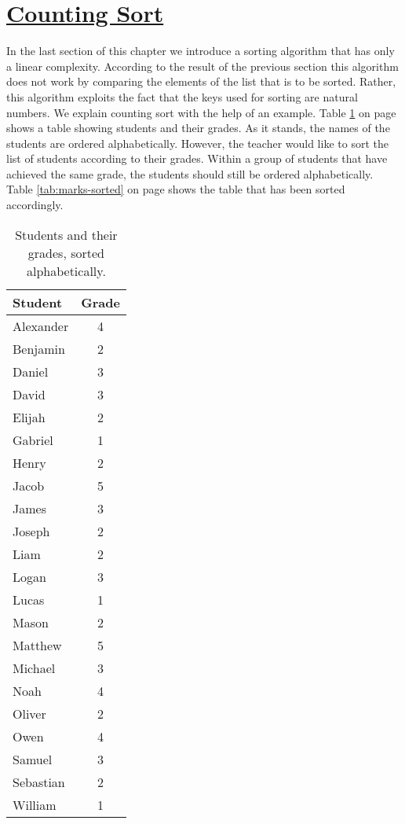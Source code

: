 \section{\href{https://en.wikipedia.org/wiki/Counting_sort}{Counting Sort}}
In the last section of this chapter we introduce a sorting algorithm that has only a linear complexity.  According
to the result of the previous section this algorithm does not work by comparing the elements of the list that
is to be sorted.  Rather, this algorithm exploits the fact that the keys used for sorting are natural
numbers.  We explain counting sort with the help of an example.  Table \ref{tab:marks} on page
\pageref{tab:marks} shows a table showing students and their grades. 
As it stands, the names of the students are ordered alphabetically.  However, the teacher would like to sort
the list of students according to their grades.  Within a group of students that have achieved the same grade,
the students should still be ordered alphabetically.  Table \ref{tab:marks-sorted} on page \pageref{tab:marks-sorted}
shows the table that has been sorted accordingly.

\begin{table}[!ht]
  \centering
  \begin{tabular}{|l|c|}
    \hline
    Student   & Grade \\
    \hline
    \hline
    Alexander & 4 \\
    \hline
    Benjamin  & 2 \\
    \hline
    Daniel    & 3 \\
    \hline
    David     & 3 \\
    \hline
    Elijah    & 2 \\
    \hline
    Gabriel   & 1 \\
    \hline
    Henry     & 2 \\
    \hline
    Jacob     & 5 \\
    \hline
    James     & 3 \\
    \hline
    Joseph    & 2 \\
    \hline
    Liam      & 2 \\
    \hline
    Logan     & 3 \\
    \hline
    Lucas     & 1 \\
    \hline
    Mason     & 2 \\
    \hline
    Matthew   & 5 \\
    \hline
    Michael   & 3 \\
    \hline
    Noah      & 4 \\
    \hline
    Oliver    & 2 \\
    \hline
    Owen      & 4 \\
    \hline
    Samuel    & 3 \\
    \hline
    Sebastian & 2 \\
    \hline
    William   & 1 \\
    \hline
  \end{tabular}
  \caption{Students and their grades, sorted alphabetically.}
  \label{tab:marks}
\end{table}

